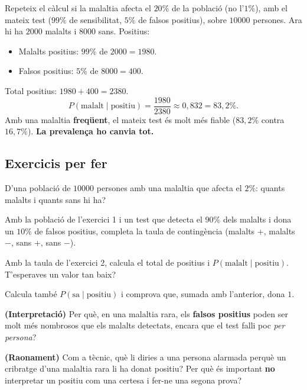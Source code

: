 \begin{exresolt}
Repeteix el càlcul si la malaltia afecta el \textbf{$20\%$} de la població (no l'$1\%$),
amb el mateix test ($99\%$ de sensibilitat, $5\%$ de falsos positius), sobre
$\num{10000}$ persones.
\solucio
Ara hi ha $\num{2000}$ malalts i $\num{8000}$ sans. Positius:
\begin{itemize}[leftmargin=1.4em, itemsep=1pt]
  \item Malalts positius: $99\%$ de $\num{2000}=\num{1980}$.
  \item Falsos positius: $5\%$ de $\num{8000}=400$.
\end{itemize}
Total positius: $\num{1980}+400=\num{2380}$.
\[
P(\text{malalt}\mid\text{positiu})=\frac{\num{1980}}{\num{2380}}\approx 0,832=83,2\%.
\]
Amb una malaltia \textbf{freqüent}, el mateix test és molt més fiable ($83,2\%$ contra
$16,7\%$). \textbf{La prevalença ho canvia tot.}
\end{exresolt}

\subsection{Exercicis per fer}

\begin{exercicis}
\begin{exlist}
  \item D'una població de $\num{10000}$ persones amb una malaltia que afecta el $2\%$:
        quants malalts i quants sans hi ha?
  \item Amb la població de l'exercici 1 i un test que detecta el $90\%$ dels malalts i
        dona un $10\%$ de falsos positius, completa la taula de contingència (malalts +,
        malalts $-$, sans +, sans $-$).
  \item Amb la taula de l'exercici 2, calcula el total de positius i
        $P(\text{malalt}\mid\text{positiu})$. T'esperaves un valor tan baix?
  \item Calcula també $P(\text{sa}\mid\text{positiu})$ i comprova que, sumada amb
        l'anterior, dona $1$.
  \item \textbf{(Interpretació)} Per què, en una malaltia rara, els \textbf{falsos
        positius} poden ser molt més nombrosos que els malalts detectats, encara que el
        test falli poc \emph{per persona}?
  \item \textbf{(Raonament)} Com a tècnic, què li diries a una persona alarmada perquè
        un cribratge d'una malaltia rara li ha donat positiu? Per què és important
        \textbf{no} interpretar un positiu com una certesa i fer-ne una segona prova?
\end{exlist}
\end{exercicis}

